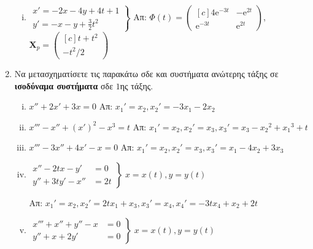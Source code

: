 \begin{enumerate}
\begin{enumerate}[i)]
      \item $ 
        \left.
          \begin{matrix}
            x'=-2x-4y+4t+1 \\
            y'=-x-y+ \frac{3}{2} t^{2}
          \end{matrix} 
        \right\} $
        \hfill Απ: $ \Phi(t) = 
        \begin{pmatrix*}[c]
          4 \mathrm{e}^{-3t} & - \mathrm{e}^{2t} \\
          \mathrm{e}^{-3t} & \mathrm{e}^{2t}
        \end{pmatrix*} $, \; $ \mathbf{X}_{p} = 
        \begin{pmatrix*}[c] 
          t+t^{2} \\ - t^{2}/2
        \end{pmatrix*} $   
    \end{enumerate}

  \item Να μετασχηματίσετε τις παρακάτω σδε και συστήματα ανώτερης τάξης σε 
    \textbf{ισοδύναμα συστήματα} σδε $1$ης τάξης.

    \begin{enumerate}[i),itemsep=10pt]
      \item $x''+2x'+3x=0$ \hfill Απ: ${x_{1}}'= x_{2}, {x_{2}}'=-3x_{1}-2x_{2}$
      \item $x'''-x''+(x')^{2}-x^{3}=t$ 
        \hfill Απ: ${x_{1}}'= x_{2}, {x_{2}}'=x_{3},{x_{3}}'=x_{3}-{x_{2}}^{2}+
        {x_{1}}^{3}+t$
      \item $x'''-3x''+4x'-x=0$ 
        \hfill Απ: ${x_{1}}'= x_{2}, {x_{2}}'=x_{3}, {x_{3}}'=x_{1}-4x_{2}+3x_{3}$
      \item
        \(
        \left.
          \begin{aligned}
            x''- 2tx - y'  &=0 \\
            y''+3ty' -x'' &=2t
          \end{aligned}
        \right\}\; x=x(t), y=y(t)
        \)

        \hfill Απ: ${x_{1}}'= x_{2}, {x_{2}}'=2tx_{1}+x_{3}, {x_{3}}'=x_{4}, {x_{4}}'
        =-3tx_{4}+x_{2}+2t$
      \item
        \(
        \left.
          \begin{aligned}
            x'''+ x'' + y'' - x &=0 \\
            y''+x +2y' &=0
          \end{aligned}
        \right\}\; x=x(t), y=y(t)
        \)


\end{enumerate}
\end{enumerate}
